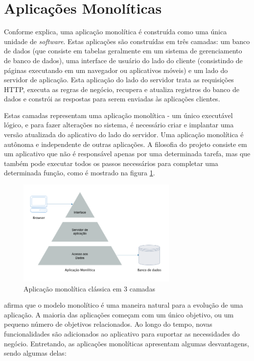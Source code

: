 \section{Aplicações Monolíticas}\label{sec:monolitico}

Conforme  explica, uma aplicação monolítica é construída como uma única unidade de \textit{software}. Estas aplicações são construídas em três camadas: um banco de dados (que consiste em tabelas geralmente em um sistema de gerenciamento de banco de dados), uma interface de usuário do lado do cliente (consistindo de páginas executando em um navegador ou aplicativos móveis) e um lado do servidor de aplicação. Esta aplicação do lado do servidor trata as requisições HTTP, executa as regras de negócio, recupera e atualiza registros do banco de dados e constrói as respostas para serem enviadas às aplicações clientes. 

Estas camadas representam uma aplicação monolítica - um único executável lógico, e para fazer alterações no sistema, é necessário criar e implantar uma versão atualizada do aplicativo do lado do servidor. Uma aplicação monolítica é autônoma e independente de outras aplicações. A filosofia do projeto consiste em um aplicativo que não é responsável apenas por uma determinada tarefa, mas que também pode executar todos os passos necessários para completar uma determinada função, como é mostrado na figura \ref{fig:three-tier}.

\begin{figure}[htbp]
    \centering
    \includegraphics[width=0.7\textwidth]{figuras/monolithic-3-tier.png}
    \caption{Aplicação monolítica clássica em 3 camadas}
    \label{fig:three-tier}
\end{figure}

 afirma que o modelo monolítico é uma maneira natural para a evolução de uma aplicação. A maioria das aplicações começam com um único objetivo, ou um pequeno número de objetivos relacionados. Ao longo do tempo, novas funcionalidades são adicionados ao aplicativo para suportar as necessidades do negócio. Entretando, as aplicações monolíticas apresentam algumas desvantagens, sendo algumas delas: 

